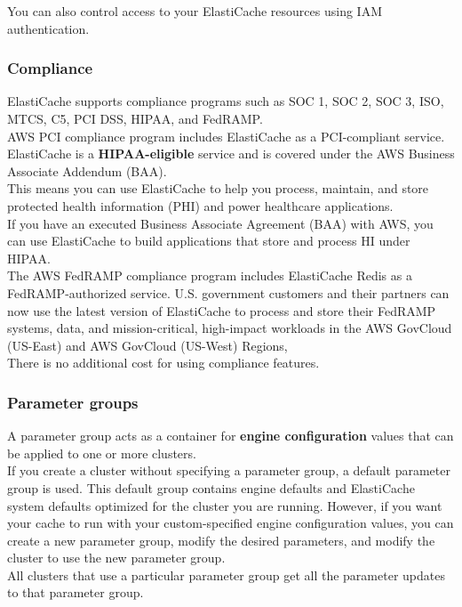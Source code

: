 \documentclass[12pt, letterpaper, twoside]{article}
\begin{document}
You can also control access to your ElastiCache resources using IAM authentication.\\

\subsubsection{Compliance}
ElastiCache supports compliance programs such as SOC 1, SOC 2, SOC 3, ISO, MTCS, C5, PCI DSS, HIPAA, and FedRAMP.\\
AWS PCI compliance program includes ElastiCache as a PCI-compliant service.\\

ElastiCache is a \textbf{HIPAA-eligible} service and is covered under the AWS Business Associate Addendum (BAA).\\
This means you can use ElastiCache to help you process, maintain, and store protected health information (PHI) and 
power healthcare applications.\\

If you have an executed Business Associate Agreement (BAA) with AWS, you can use ElastiCache to build applications 
that store and process HI under HIPAA.\\

The AWS FedRAMP compliance program includes ElastiCache Redis as a FedRAMP-authorized service. U.S. government customers 
and their partners can now use the latest version of ElastiCache to process and store their FedRAMP systems, data, 
and mission-critical, high-impact workloads in the AWS GovCloud (US-East) and AWS GovCloud (US-West) Regions,\\

There is no additional cost for using compliance features.\\

\subsubsection{Parameter groups}
A parameter group acts as a container for \textbf{engine configuration} values that can be applied to one or more clusters.\\
If you create a cluster without specifying a parameter group, a default parameter group is used. This default group 
contains engine defaults and ElastiCache system defaults optimized for the cluster you are running. However, if you 
want your cache to run with your custom-specified engine configuration values, you can create a new parameter group, 
modify the desired parameters, and modify the cluster to use the new parameter group.\\
All clusters that use a particular parameter group get all the parameter updates to that parameter group.\\
\end{document}
